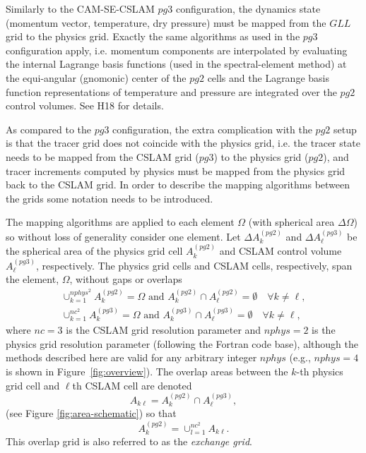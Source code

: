 \documentclass[draft,linenumbers]{agujournal}
\begin{document}
Similarly to the CAM-SE-CSLAM $pg3$ configuration, the dynamics state (momentum vector, temperature, dry pressure) must be mapped from the $GLL$ grid to the physics grid. Exactly the same algorithms as used in the $pg3$ configuration apply, i.e. momentum components are interpolated by evaluating the internal Lagrange basis functions (used in the spectral-element method) at the equi-angular (gnomonic) center of the $pg2$ cells and the Lagrange basis function representations of temperature and pressure are integrated over the $pg2$ control volumes. See H18 for details.

As compared to the $pg3$ configuration, the extra complication with the $pg2$ setup is that the tracer grid does not coincide with the physics grid, i.e. the tracer state needs to be mapped from the CSLAM grid ($pg3$) to the physics grid ($pg2$), and tracer increments computed by physics must be mapped from the physics grid back to the CSLAM grid. In order to describe the mapping algorithms between the grids some notation needs to be introduced.

The mapping algorithms are applied to each element $\Omega$ (with spherical area $\Delta \Omega$) so without loss of generality consider one element. Let $\Delta A^{(pg2)}_k$ and $\Delta A^{(pg3)}_\ell$ be the spherical area of the physics grid cell $A^{(pg2)}_k$ and CSLAM control volume $A^{(pg3)}_\ell$, respectively. The physics grid cells and CSLAM cells, respectively, span the element, $\Omega$, without gaps or overlaps
\begin{eqnarray}
\cup_{k=1}^{nphys^2}A^{(pg2)}_k=\Omega \text{ and } A^{(pg2)}_k \cap A^{(pg2)}_\ell = \emptyset \quad \forall k\ne \ell,\\
\cup_{k=1}^{nc^2}A^{(pg3)}_k=\Omega \text{ and } A^{(pg3)}_k \cap A^{(pg3)}_\ell = \emptyset \quad \forall k\ne \ell,
\end{eqnarray}
where $nc=3$ is the CSLAM grid resolution parameter and $nphys=2$ is the physics grid resolution parameter (following the Fortran code base), although the methods described here are valid for any arbitrary integer $nphys$ (e.g., $nphys=4$ is shown in Figure~\ref{fig:overview}). The overlap areas between the $k$-th physics grid cell and $\ell$th CSLAM cell are denoted
\begin{equation}
A_{k\ell}=A^{(pg2)}_k \cap A^{(pg3)}_\ell,
\end{equation}
(see Figure \ref{fig:area-schematic}) so that
\begin{equation}
A^{(pg2)}_k=\cup_{l=1}^{nc^2}A_{k\ell}.
\end{equation}
This overlap grid is also referred to as the {\em{exchange grid}}.
\end{document}
